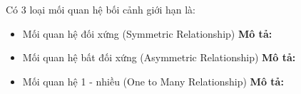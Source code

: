 Có 3 loại mối quan hệ bối cảnh giới hạn là:

\begin{itemize}
    \item Mối quan hệ đối xứng (Symmetric Relationship)
          \textbf{Mô tả:} 

    \item Mối quan hệ bất đối xứng (Asymmetric Relationship)
          \textbf{Mô tả:} 

    \item Mối quan hệ 1 - nhiều (One to Many Relationship)
          \textbf{Mô tả:} 

\end{itemize}

% 